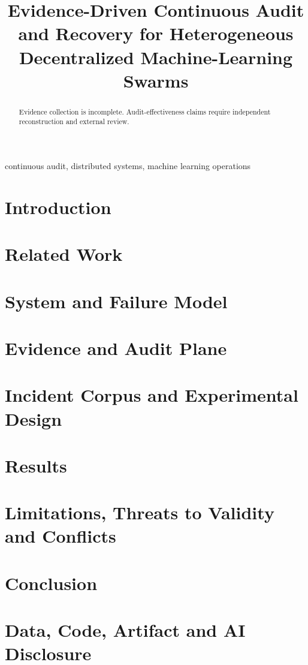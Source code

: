 \documentclass[conference]{IEEEtran}
\title{Evidence-Driven Continuous Audit and Recovery for Heterogeneous Decentralized Machine-Learning Swarms}
\author{\IEEEauthorblockN{Harvey}}
\begin{document}
\maketitle
\begin{abstract}
Evidence collection is incomplete. Audit-effectiveness claims require independent reconstruction and external review.
\end{abstract}
\begin{IEEEkeywords}
continuous audit, distributed systems, machine learning operations
\end{IEEEkeywords}
\section{Introduction}
\section{Related Work}
\section{System and Failure Model}
\section{Evidence and Audit Plane}
\section{Incident Corpus and Experimental Design}
\section{Results}
\section{Limitations, Threats to Validity and Conflicts}
\section{Conclusion}
\section*{Data, Code, Artifact and AI Disclosure}


\end{document}
